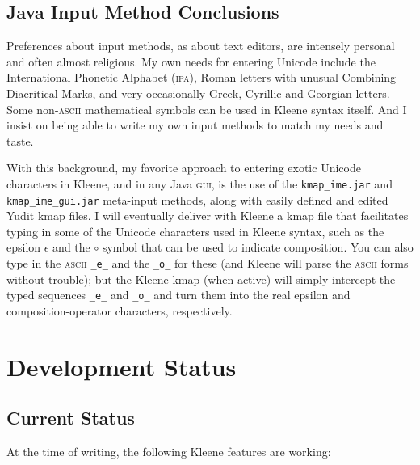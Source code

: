 \documentclass[letterpaper,12pt]{article}
\newcommand{\Kleene}{Kleene\xspace}
\newcommand{\acro}{\textsc}
\begin{document}
\subsection{Java Input Method Conclusions}

Preferences about input methods, as about text editors, are intensely
personal and often almost religious.  My own needs for entering Unicode
include the International Phonetic Alphabet (\acro{ipa}), Roman letters
with unusual Combining Diacritical Marks, and very occasionally Greek,
Cyrillic and Georgian letters.  Some non-\acro{ascii} mathematical
symbols can be used in Kleene syntax itself.  And I insist on being able
to write my own input methods to match my needs and taste.

With this background, my favorite approach to entering exotic Unicode
characters in Kleene, and in any Java \acro{gui}, is the use of the
\texttt{kmap\_ime.jar} and \texttt{kmap\_ime\_gui.jar} meta-input
methods, along with easily defined and edited Yudit kmap files.  I will
eventually deliver with Kleene a kmap file that facilitates typing in
some of the Unicode characters used in Kleene syntax, such as the epsilon
$\epsilon$ and the $\circ$ symbol that can be used to indicate
composition.  You can also type in the \acro{ascii} \verb!_e_! and the
\verb!_o_! for these (and Kleene will parse the \acro{ascii} forms
without trouble); but the Kleene kmap (when active) will simply intercept
the typed sequences \verb!_e_! and \verb!_o_! and turn them into the real
epsilon and composition-operator characters, respectively.
 
 
\section{Development Status}

\subsection{Current Status}

At the time of writing, the following \Kleene{} features are working:
\end{document}
